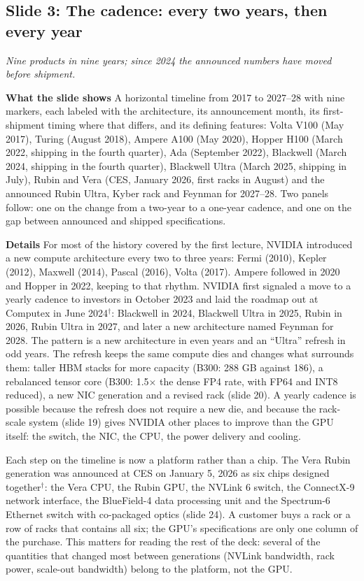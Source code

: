\documentclass[11pt,letterpaper]{article}
\newcommand{\slide}[3]{%
  \subsection[Slide #1: #2]{Slide #1: #2}%
  {\color{muted}\itshape #3\par}\medskip}
\newcommand{\para}[1]{\medskip\noindent\textbf{#1}\quad}
\begin{document}
\slide{3}{The cadence: every two years, then every year}{Nine products in nine years; since 2024 the announced numbers have moved before shipment.}

\para{What the slide shows} A horizontal timeline from 2017 to 2027--28 with nine markers, each labeled with the architecture, its announcement month, its first-shipment timing where that differs, and its defining features: Volta V100 (May 2017), Turing (August 2018), Ampere A100 (May 2020), Hopper H100 (March 2022, shipping in the fourth quarter), Ada (September 2022), Blackwell (March 2024, shipping in the fourth quarter), Blackwell Ultra (March 2025, shipping in July), Rubin and Vera (CES, January 2026, first racks in August) and the announced Rubin Ultra, Kyber rack and Feynman for 2027--28. Two panels follow: one on the change from a two-year to a one-year cadence, and one on the gap between announced and shipped specifications.

\para{Details} For most of the history covered by the first lecture, NVIDIA introduced a new compute architecture every two to three years: Fermi (2010), Kepler (2012), Maxwell (2014), Pascal (2016), Volta (2017). Ampere followed in 2020 and Hopper in 2022, keeping to that rhythm. NVIDIA first signaled a move to a yearly cadence to investors in October 2023 and laid the roadmap out at Computex in June 2024$^\dagger$: Blackwell in 2024, Blackwell Ultra in 2025, Rubin in 2026, Rubin Ultra in 2027, and later a new architecture named Feynman for 2028. The pattern is a new architecture in even years and an ``Ultra'' refresh in odd years. The refresh keeps the same compute dies and changes what surrounds them: taller HBM stacks for more capacity (B300: 288 GB against 186), a rebalanced tensor core (B300: 1.5$\times$ the dense FP4 rate, with FP64 and INT8 reduced), a new NIC generation and a revised rack (slide 20). A yearly cadence is possible because the refresh does not require a new die, and because the rack-scale system (slide 19) gives NVIDIA other places to improve than the GPU itself: the switch, the NIC, the CPU, the power delivery and cooling.

Each step on the timeline is now a platform rather than a chip. The Vera Rubin generation was announced at CES on January 5, 2026 as six chips designed together$^\dagger$: the Vera CPU, the Rubin GPU, the NVLink 6 switch, the ConnectX-9 network interface, the BlueField-4 data processing unit and the Spectrum-6 Ethernet switch with co-packaged optics (slide 24). A customer buys a rack or a row of racks that contains all six; the GPU's specifications are only one column of the purchase. This matters for reading the rest of the deck: several of the quantities that changed most between generations (NVLink bandwidth, rack power, scale-out bandwidth) belong to the platform, not the GPU.
\end{document}

